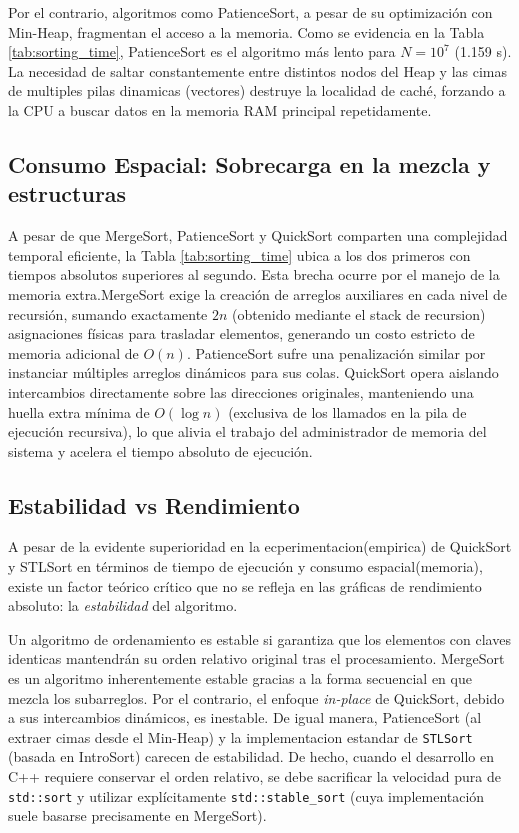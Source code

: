 Por el contrario, algoritmos como PatienceSort, a pesar de su optimización con Min-Heap, fragmentan el acceso a la memoria. Como se evidencia en la Tabla \ref{tab:sorting_time}, PatienceSort es el algoritmo más lento para $N=10^7$
(1.159 s). La necesidad de saltar constantemente entre distintos nodos del Heap y las cimas de multiples pilas dinamicas (vectores) destruye la localidad de caché, forzando a la CPU a buscar datos en la memoria RAM principal repetidamente.


\subsection{Consumo Espacial: Sobrecarga en la mezcla y estructuras}A pesar de que MergeSort, PatienceSort y QuickSort comparten una complejidad temporal eficiente, la Tabla \ref{tab:sorting_time} ubica a los dos primeros con tiempos absolutos superiores al segundo. Esta brecha ocurre por el manejo de la memoria extra.MergeSort exige la creación de arreglos auxiliares en cada nivel de recursión, sumando exactamente $2n$ (obtenido mediante el stack de recursion) asignaciones físicas para trasladar elementos, generando un costo estricto de memoria adicional de $O(n)$. PatienceSort sufre una penalización similar por instanciar múltiples arreglos dinámicos para sus colas. QuickSort opera aislando intercambios directamente sobre las direcciones originales, manteniendo una huella extra mínima de $O(\log n)$ (exclusiva de los llamados en la pila de ejecución recursiva), lo que alivia el trabajo del administrador de memoria del sistema y acelera el tiempo absoluto de ejecución.


\subsection{Estabilidad vs Rendimiento}
A pesar de la evidente superioridad en la ecperimentacion(empirica) de QuickSort y STLSort en términos de tiempo de ejecución y consumo espacial(memoria), existe un factor teórico crítico que no se refleja en las gráficas de rendimiento absoluto: la \textit{estabilidad} del algoritmo. 

Un algoritmo de ordenamiento es estable si garantiza que los elementos con claves identicas mantendrán su orden relativo original tras el procesamiento. MergeSort es un algoritmo inherentemente estable gracias a la forma secuencial en que mezcla los subarreglos. Por el contrario, el enfoque \textit{in-place} de QuickSort, debido a sus intercambios dinámicos, es inestable. De igual manera, PatienceSort (al extraer cimas desde el Min-Heap) y la implementacion estandar de \texttt{STLSort} (basada en IntroSort) carecen de estabilidad. De hecho, cuando el desarrollo en C++ requiere conservar el orden relativo, se debe sacrificar la velocidad pura de \texttt{std::sort} y utilizar explícitamente \texttt{std::stable\_sort} (cuya implementación suele basarse precisamente en MergeSort).

